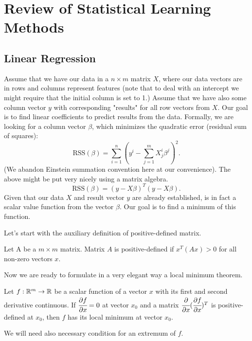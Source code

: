 \documentclass[main.tex]{subfiles}
\begin{document}
\section{Review of Statistical Learning Methods}
\subsection{Linear Regression}
Assume that we have our data in a $n\times m$ matrix $X$, where our data vectors are in rows and columns represent features (note that to deal with an intercept we might require that the initial column is set to 1.) Assume that we have also some column vector $y$ with corresponding "results" for all row vectors from $X$. Our goal is to find linear coefficients to predict results from the data. Formally, we are looking for a column vector $\beta$, which minimizes the quadratic error (residual sum of squares):
\begin{equation}
\text{RSS}(\beta) =
\sum_{i=1}^n(y^i - \sum_{j=1}^m X^i_j \beta^j)^2.
\end{equation}
(We abandon Einstein summation convention here at our convenience).
The above might be put very nicely using a matrix algebra.
\begin{equation}
    \text{RSS}(\beta) = (y - X\beta)^T(y - X\beta).
\end{equation}
Given that our data $X$ and result vector $y$ are already established,  is in fact a scalar value function from the vector $\beta$. Our goal is to find a minimum of this function.

Let's start with the auxiliary definition of positive-defined matrix.

\begin{definition}
Let A be a $m\times m$ matrix. Matrix $A$ is positive-defined if $x^T(Ax) > 0$ for all non-zero vectors $x$.
\end{definition}
Now we are ready to formulate in a very elegant way a local minimum theorem.

\begin{theorem}
\label{local_minimum}
Let $f:\mathbb{R}^m \to \mathbb{R}$ be a scalar function of a vector $x$ with its first and second derivative continuous. If $\cfrac{\partial f}{\partial x} = 0$ at vector $x_0$ and a matrix $\cfrac{\partial}{\partial x}(\cfrac{\partial f}{\partial x})^T$ is positive-defined at $x_0$, then $f$ has its local minimum at vector $x_0$.
\end{theorem}

We will need also necessary condition for an extremum of $f$.
\end{document}
